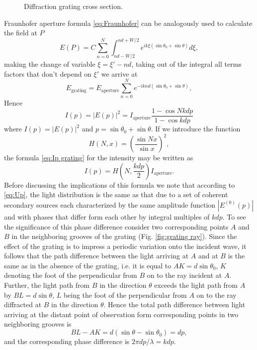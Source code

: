 \documentclass[12pt,twoside,english]{book}
\renewcommand{\~}{\perispomeni}%
\numberwithin{equation}{section}
\numberwithin{figure}{section}
\begin{document}
\begin{figure}[h]
\center{}
\caption{Diffraction grating cross section.}
\label{fig:grating ex}
\end{figure}
Fraunhofer aperture formula \ref{eq:Fraunhofer} can be analogously used to calculate the field at $P$
\begin{equation}
E\left(P\right)=C\sum_{n=0}^{N}\int_{nd-W/2}^{nd+W/2}e^{ik\xi\left(\sin\theta_{0}+\sin\theta\right)}d\xi,
\end{equation}
making the change of variable $\xi=\xi'-nd$, taking out of the integral all terms factors that don't depend on $\xi'$ we arrive at
\begin{equation}
E_{\text{grating}}=E_{\text{aperture}}\sum_{n=0}^{N}e^{-iknd\left(\sin\theta_{0}+\sin\theta\right)},
\label{eq:Up}
\end{equation}
Hence 
\begin{equation}
I\left(p\right)=\left|E\left(p\right)\right|^{2}=I_{\text{aperture}}\frac{1-\cos Nkdp}{1-\cos kdp}
\label{eq:Ip grating}
\end{equation}
where $I\left(p\right)=\left|E\left(p\right)\right|^{2}$ and $p=\sin\theta_{0}+\sin\theta$. If we introduce the function
\begin{equation}
H\left(N,x\right)=\left(\frac{\sin Nx}{\sin x}\right)^{2},
\end{equation}
the formula \ref{eq:Ip grating} for the intensity may be written as
\begin{equation}
I\left(p\right)=H\left(N,\frac{kdp}{2}\right)I_{\text{aperture}}.
\label{eq:intensity grating}
\end{equation}
Before discussing the implications of this formula we note that according to \ref{eq:Up}, the light distribution is the same as that due to a set of coherent secondary sources each characterized by the same amplitude function $\left|E^{\left(0\right)}\left(p\right)\right|$ and with phases that differ form each other by integral multiples of $kdp$. To see the significance of this phase difference consider two corresponding points $A$ and $B$ in the neighboring grooves of the grating (Fig. \ref{fig:grating ray}). Since the effect of the grating is to impress a periodic variation onto the incident wave, it follows that the path difference between the light arriving at $A$ and at $B$ is the same as in the absence of the grating, i.e. it is equal to $AK=d\sin\theta_{0}$, $K$ denoting the foot of the perpendicular from $B$ on to the ray incident at $A$. Further, the light path from $B$ in the direction $\theta$ exceeds the light path from $A$ by $BL=d\sin\theta$, $L$ being the foot of the perpendicular from $A$ on to the ray diffracted at $B$ in the direction $\theta.$ Hence the total path difference between light arriving at the distant point of observation form corresponding points in two neighboring grooves is
\begin{equation}
BL-AK=d\left(\sin\theta-\sin\theta_{0}\right)=dp,
\label{eq:path difference}
\end{equation}
 and the corresponding phase difference is $2\pi dp/\lambda=kdp$.
\end{document}
